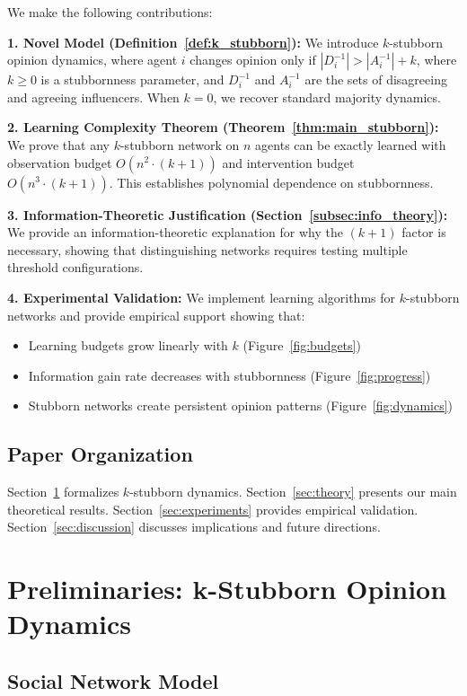 \documentclass[conference]{IEEEtran}
\begin{document}
We make the following contributions:

\textbf{1. Novel Model (Definition~\ref{def:k_stubborn}):} We introduce $k$-stubborn opinion dynamics, where agent $i$ changes opinion only if $|D_i^{-1}| > |A_i^{-1}| + k$, where $k \geq 0$ is a stubbornness parameter, and $D_i^{-1}$ and $A_i^{-1}$ are the sets of disagreeing and agreeing influencers. When $k=0$, we recover standard majority dynamics.

\textbf{2. Learning Complexity Theorem (Theorem~\ref{thm:main_stubborn}):} We prove that any $k$-stubborn network on $n$ agents can be exactly learned with observation budget $O(n^2 \cdot (k+1))$ and intervention budget $O(n^3 \cdot (k+1))$. This establishes polynomial dependence on stubbornness.

\textbf{3. Information-Theoretic Justification (Section~\ref{subsec:info_theory}):} We provide an information-theoretic explanation for why the $(k+1)$ factor is necessary, showing that distinguishing networks requires testing multiple threshold configurations.

\textbf{4. Experimental Validation:} We implement learning algorithms for $k$-stubborn networks and provide empirical support showing that:
\begin{itemize}
\item Learning budgets grow linearly with $k$ (Figure~\ref{fig:budgets})
\item Information gain rate decreases with stubbornness (Figure~\ref{fig:progress})
\item Stubborn networks create persistent opinion patterns (Figure~\ref{fig:dynamics})
\end{itemize}

\subsection{Paper Organization}

Section~\ref{sec:preliminaries} formalizes $k$-stubborn dynamics. Section~\ref{sec:theory} presents our main theoretical results. Section~\ref{sec:experiments} provides empirical validation. Section~\ref{sec:discussion} discusses implications and future directions.

\section{Preliminaries: k-Stubborn Opinion Dynamics}
\label{sec:preliminaries}

\subsection{Social Network Model}
\end{document}
